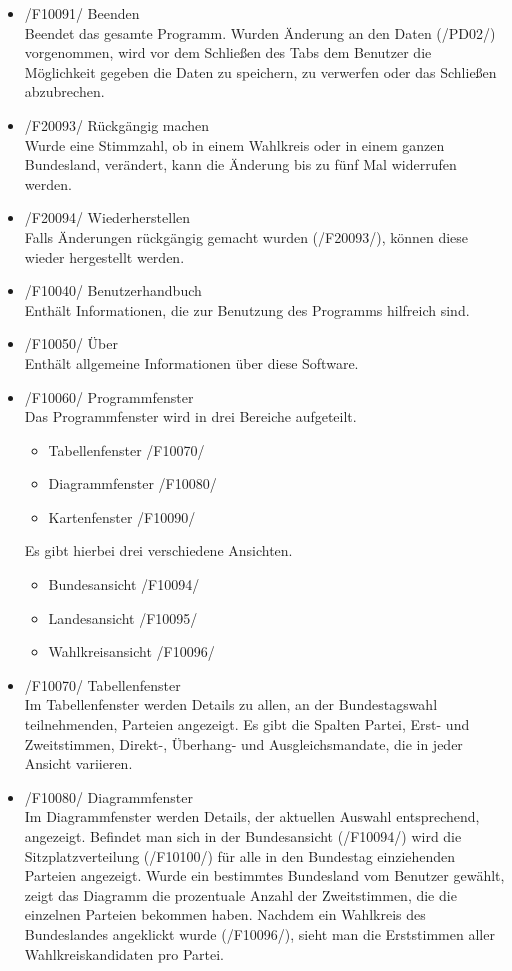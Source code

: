 \documentclass[10pt,a4paper]{article}
\begin{document}
\begin{itemize}
	\item /F10091/ Beenden \hfill \\
	Beendet das gesamte Programm. Wurden Änderung an den Daten (/PD02/) vorgenommen, wird vor dem Schließen des Tabs dem Benutzer die Möglichkeit gegeben die Daten zu speichern, zu verwerfen oder das Schließen abzubrechen.
	\item /F20093/ Rückgängig machen \hfill \\
	Wurde eine Stimmzahl, ob in einem Wahlkreis oder in einem ganzen Bundesland, verändert, kann die Änderung bis zu fünf Mal widerrufen werden.
	\item /F20094/ Wiederherstellen \hfill \\
	Falls Änderungen rückgängig gemacht wurden (/F20093/), können diese wieder hergestellt werden.
	\item /F10040/ Benutzerhandbuch \hfill \\
	Enthält Informationen, die zur Benutzung des Programms hilfreich sind.
	\item /F10050/ Über \hfill \\
	Enthält allgemeine Informationen über diese Software.
	\item /F10060/ Programmfenster \hfill \\
	Das Programmfenster wird in drei Bereiche aufgeteilt.
	\begin{itemize}
		\item Tabellenfenster /F10070/
		\item Diagrammfenster /F10080/
		\item Kartenfenster /F10090/
	\end{itemize}
	Es gibt hierbei drei verschiedene Ansichten.
	\begin{itemize}
		\item Bundesansicht /F10094/
		\item Landesansicht /F10095/
		\item Wahlkreisansicht /F10096/
	\end{itemize}
	\item /F10070/ Tabellenfenster \hfill \\
	Im Tabellenfenster werden Details zu allen, an der Bundestagswahl teilnehmenden, Parteien angezeigt.
	Es gibt die Spalten Partei, Erst- und Zweitstimmen, Direkt-, Überhang- und Ausgleichsmandate, die in jeder Ansicht variieren. \hfill \\
	\item /F10080/ Diagrammfenster \hfill \\
	Im Diagrammfenster werden Details, der aktuellen Auswahl entsprechend, angezeigt. Befindet man sich in der Bundesansicht (/F10094/) wird die Sitzplatzverteilung (/F10100/) für alle in den Bundestag einziehenden Parteien angezeigt. Wurde ein bestimmtes Bundesland vom Benutzer gewählt, zeigt das Diagramm die prozentuale Anzahl der Zweitstimmen, die die einzelnen Parteien bekommen haben. Nachdem ein Wahlkreis des Bundeslandes angeklickt wurde (/F10096/), sieht man die Erststimmen aller Wahlkreiskandidaten pro Partei. \hfill \\

\end{itemize}
\end{document}

